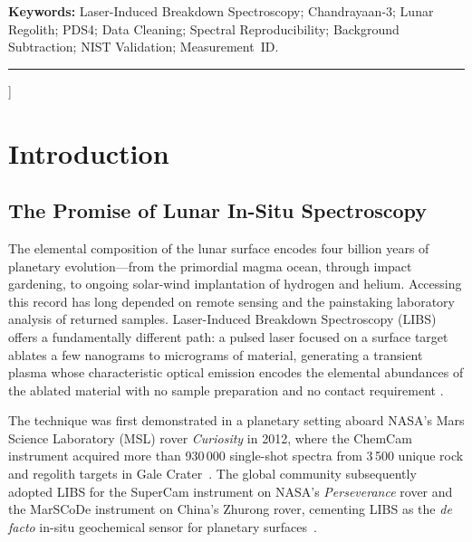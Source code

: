 \documentclass[a4paper,twocolumn,10pt]{article}
\begin{document}
{\begin{@twocolumnfalse}
\begin{abstract}
LunarAtlas further provides a PDS4-aware PostgreSQL schema, adaptive
min--max downsampling with a mathematically defined zoom-saturation
criterion, and a versioned API with sub-\SI{500}{\milli\second}
response times.  By establishing a ``single source of scientific
truth,'' the system offers a replicable methodology for
Chandrayaan-4, Artemis-era VIPER, and Commercial Lunar Payload
Services (CLPS) LIBS instruments.
\end{abstract}
\vspace{4pt}
\noindent\textbf{Keywords:} Laser-Induced Breakdown Spectroscopy;
Chandrayaan-3; Lunar Regolith; PDS4; Data Cleaning; Spectral
Reproducibility; Background Subtraction; NIST Validation;
Measurement~ID.

\vspace{10pt}\hrule\vspace{12pt}
\end{@twocolumnfalse}
}]


\section{Introduction}
\label{sec:intro}

\subsection{The Promise of Lunar In-Situ Spectroscopy}

The elemental composition of the lunar surface encodes four billion
years of planetary evolution---from the primordial magma ocean, through
impact gardening, to ongoing solar-wind implantation of hydrogen and
helium.  Accessing this record has long depended on remote sensing and
the painstaking laboratory analysis of returned samples.  Laser-Induced
Breakdown Spectroscopy (LIBS) offers a fundamentally different path: a
pulsed laser focused on a surface target ablates a few nanograms to
micrograms of material, generating a transient plasma whose
characteristic optical emission encodes the elemental abundances of the
ablated material with no sample preparation and no contact requirement
\cite{Cremers2006,Wiens2012}.

The technique was first demonstrated in a planetary setting aboard
NASA's Mars Science Laboratory (MSL) rover \emph{Curiosity} in 2012,
where the ChemCam instrument acquired more than 930\,000 single-shot
spectra from 3\,500 unique rock and regolith targets in Gale
Crater~\cite{Wiens2012,Maurice2012,Gasnault2023}.  The global
community subsequently adopted LIBS for the SuperCam instrument on
NASA's \emph{Perseverance} rover and the MarSCoDe instrument on
China's Zhurong rover, cementing LIBS as the \emph{de facto} in-situ
geochemical sensor for planetary surfaces~\cite{Wiens2020,Xu2021}.
\end{document}
